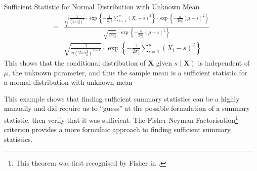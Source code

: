 \documentclass[11pt,a4paper,margin=0]{article}
\theoremstyle{break}
\begin{document}
\begin{example}{Sufficient Statistic for Normal Distribution with Unknown Mean}
\[\begin{array}{rcl}
      &=&\frac{\sqrt{\frac1{\left(2\pi\sigma_0^2\right)^n}}\cdot\exp\left\{-\frac1{2\sigma_0^2}\sum_{i=1}^n(X_i-s)^2\right\}\cdot\exp\left\{-\frac{n}{2\sigma_0^2}(\mu-s)^2\right\}}{\sqrt{\frac{n}{2\pi\sigma_0^2}}\cdot\exp\left\{-\frac{n}{2\sigma_0^2}(\mu-s)^2\right\}}\\
      &=&\sqrt{\frac{1}{n(2\pi\sigma_0^2)^{n-1}}}\cdot\exp\left\{-\frac1{2\sigma_0^2}\sum_{i=1}^n(X_i-s)^2\right\}
    \end{array}\]
    This shows that the conditional distribution of $\mathbf{X}$ given $s(\mathbf{X})$ is independent of $\mu$, the unknown parameter, and thus the sample mean is a sufficient statistic for a normal distribution with unknown mean
  \end{example}

  \par This example shows that finding sufficient summary statistics can be a highly manually and did require us to ``guess'' at the possible formulation of a summary statistic, then verify that it was sufficient. The Fisher-Neyman Factorisation\footnote{This theorem was first recognised by Fisher in \cite[]{fisher_neyman_factorisation_theorem_orig}.} criterion provides a more formulaic approach to finding sufficient summary statistics.
\end{document}
